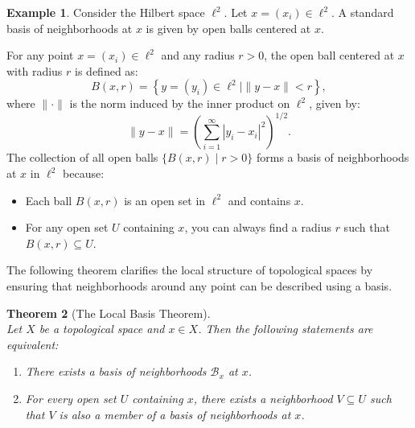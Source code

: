\documentclass[12pt, reqno]{amsart}
\newtheorem{theorem}{Theorem}[section]
\theoremstyle{definition}
\newtheorem{example}[theorem]{Example}
\numberwithin{equation}{section}
\begin{document}
\begin{example}
    Consider the Hilbert space $\ell^2$. Let $x = (x_i) \in \ell^2$. A standard basis of neighborhoods at $x$ is given by open balls centered at $x$.

For any point $x = (x_i) \in \ell^2$ and any radius $r > 0$, the open ball centered at $x$ with radius $r$ is defined as:
   \[
   B(x, r) = \left\{ y = (y_i) \in \ell^2 \mid \|y - x\| < r \right\},
   \]
   where $\| \cdot \|$ is the norm induced by the inner product on $\ell^2$, given by:
   \[
   \|y - x\| = \left( \sum_{i=1}^\infty |y_i - x_i|^2 \right)^{1/2}.
   \]
The collection of all open balls $\{ B(x, r) \mid r > 0 \}$ forms a basis of neighborhoods at $x$ in $\ell^2$ because:
   \begin{itemize}
     \item Each ball $B(x, r)$ is an open set in $\ell^2$ and contains $x$.
     \item For any open set $U$ containing $x$, you can always find a radius $r$ such that $B(x, r) \subseteq U$.
   \end{itemize}

\end{example}

The following theorem clarifies the local structure of topological spaces by ensuring that neighborhoods around any point can be described using a basis.

\begin{theorem} [The Local Basis Theorem] \hfill \\
Let $X$ be a topological space and $x \in X$. Then the following statements are equivalent:

\begin{enumerate}
  \item There exists a basis of neighborhoods $\mathcal{B}_x$ at $x$.
  \item For every open set $U$ containing $x$, there exists a neighborhood $V \subseteq U$ such that $V$ is also a member of a basis of neighborhoods at $x$.
\end{enumerate}
\end{theorem}
\end{document}

